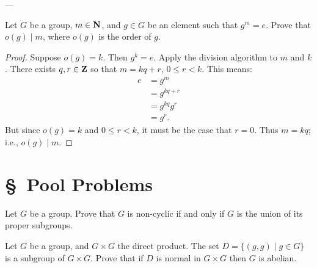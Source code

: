 \documentclass[11pt,twoside,openany]{memoir}
\begin{document}
    ---

    \begin{exercise}
        Let $G$ be a group, $m \in \mathbf{N}$, and $g \in G$ be an element such that $g^m = e$. Prove that $o(g) \mid m$, where $o(g)$ is the order of $g$.
    \end{exercise}
        {\color{blue} \begin{proof}
            Suppose $o(g) = k$. Then $g^k = e$. Apply the division algorithm to $m$ and $k$. There exists $q,r \in \mathbf{Z}$ so that $m = kq + r$, $0 \leq r < k$. This means:
                \begin{equation*}
                \begin{split}
                    e
                    & = g^m \\ 
                    & = g^{kq+r} \\
                    & = g^{kq}g^r \\
                    & = g^r.
                \end{split}
                \end{equation*}
            But since $o(g) = k$ and $0\leq r < k$, it must be the case that $r = 0$. Thus $m = kq$; i.e., $o(g)\mid m$.
        \end{proof}}
    \fi
    \section*{\S\ Pool Problems}
    \endgroup

    \begin{exercise}
        Let $G$ be a group. Prove that $G$ is non-cyclic if and only if $G$ is the union of its proper subgroups.
        \end{exercise}
        
        \begin{exercise}
        Let $G$ be a group, and $G\times G$ the direct product. The set $D=\{(g,g)\mid g\in G\}$ is a subgroup of $G\times G$. Prove that if $D$ is normal in $G\times G$ then $G$ is abelian.
        \end{exercise}
        
\end{document}
